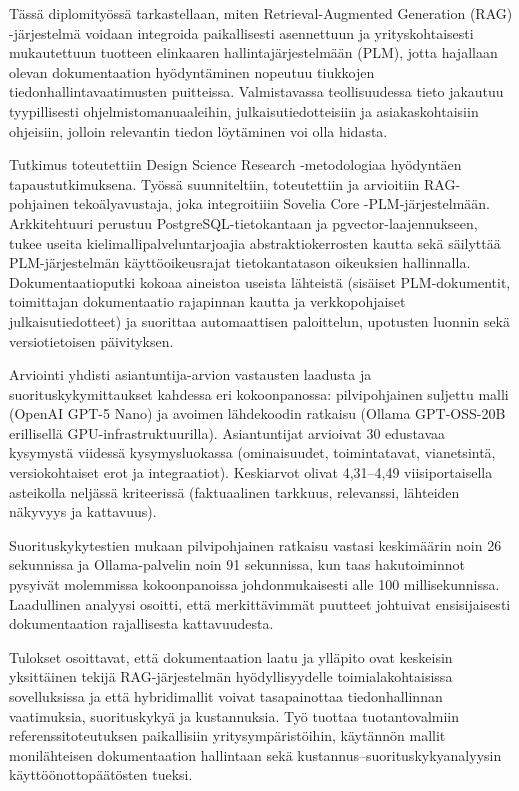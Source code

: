 Tässä diplomityössä tarkastellaan, miten Retrieval-Augmented Generation (RAG) -järjestelmä voidaan integroida paikallisesti asennettuun ja yrityskohtaisesti mukautettuun tuotteen elinkaaren hallintajärjestelmään (PLM), jotta hajallaan olevan dokumentaation hyödyntäminen nopeutuu tiukkojen tiedonhallintavaatimusten puitteissa. Valmistavassa teollisuudessa tieto jakautuu tyypillisesti ohjelmistomanuaaleihin, julkaisutiedotteisiin ja asiakaskohtaisiin ohjeisiin, jolloin relevantin tiedon löytäminen voi olla hidasta.

Tutkimus toteutettiin Design Science Research -metodologiaa hyödyntäen tapaustutkimuksena. Työssä suunniteltiin, toteutettiin ja arvioitiin RAG-pohjainen tekoälyavustaja, joka integroitiiin Sovelia Core -PLM-järjestelmään. Arkkitehtuuri perustuu PostgreSQL-tietokantaan ja pgvector-laajennukseen, tukee useita kielimallipalveluntarjoajia abstraktiokerrosten kautta sekä säilyttää PLM-järjestelmän käyttöoikeusrajat tietokantatason oikeuksien hallinnalla. Dokumentaatioputki kokoaa aineistoa useista lähteistä (sisäiset PLM-dokumentit, toimittajan dokumentaatio rajapinnan kautta ja verkkopohjaiset julkaisutiedotteet) ja suorittaa automaattisen paloittelun, upotusten luonnin sekä versiotietoisen päivityksen.

Arviointi yhdisti asiantuntija-arvion vastausten laadusta ja suorituskykymittaukset kahdessa eri kokoonpanossa: pilvipohjainen suljettu malli (OpenAI GPT-5 Nano) ja avoimen lähdekoodin ratkaisu (Ollama GPT-OSS-20B erillisellä GPU-infrastruktuurilla). Asiantuntijat arvioivat 30 edustavaa kysymystä viidessä kysymysluokassa (ominaisuudet, toimintatavat, vianetsintä, versiokohtaiset erot ja integraatiot). Keskiarvot olivat 4,31--4,49 viisiportaisella asteikolla neljässä kriteerissä (faktuaalinen tarkkuus, relevanssi, lähteiden näkyvyys ja kattavuus).

Suorituskykytestien mukaan pilvipohjainen ratkaisu vastasi keskimäärin noin 26 sekunnissa ja Ollama-palvelin noin 91 sekunnissa, kun taas hakutoiminnot pysyivät molemmissa kokoonpanoissa johdonmukaisesti alle 100 millisekunnissa. Laadullinen analyysi osoitti, että merkittävimmät puutteet johtuivat ensisijaisesti dokumentaation rajallisesta kattavuudesta.

Tulokset osoittavat, että dokumentaation laatu ja ylläpito ovat keskeisin yksittäinen tekijä RAG-järjestelmän hyödyllisyydelle toimialakohtaisissa sovelluksissa ja että hybridimallit voivat tasapainottaa tiedonhallinnan vaatimuksia, suorituskykyä ja kustannuksia. Työ tuottaa tuotantovalmiin referenssitoteutuksen paikallisiin yritysympäristöihin, käytännön mallit monilähteisen dokumentaation hallintaan sekä kustannus--suorituskykyanalyysin käyttöönottopäätösten tueksi.